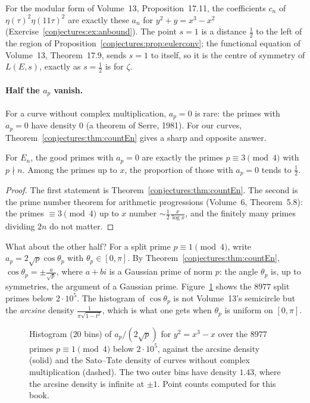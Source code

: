 For the modular form of Volume~13, Proposition~17.11, the coefficients $c_n$ of $\eta(\tau)^2\eta(11\tau)^2$ are exactly these $a_n$ for $y^2+y=x^3-x^2$
(Exercise~\ref{conjectures:ex:anbound}). The point $s=1$ is a distance $\frac12$ to the left of the region of Proposition~\ref{conjectures:prop:eulerconv}; the functional equation
of Volume~13, Theorem~17.9, sends $s=1$ to itself, so it is the centre of symmetry of $L(E,s)$, exactly as $s=\frac12$ is for $\zeta$.

\paragraph{Half the $a_p$ vanish.} For a curve without complex multiplication, $a_p=0$ is rare: the primes with $a_p=0$ have density $0$ (a theorem of Serre,
1981). For our curves, Theorem~\ref{conjectures:thm:countEn} gives a sharp and opposite answer.

\begin{corollary}\label{conjectures:cor:cmhalf}
For $E_n$, the good primes with $a_p=0$ are exactly the primes $p\equiv3\pmod4$ with $p\nmid n$. Among the primes up to $x$, the proportion of those with
$a_p=0$ tends to $\frac12$.
\end{corollary}
\begin{proof}
The first statement is Theorem~\ref{conjectures:thm:countEn}. The second is the prime number theorem for arithmetic progressions (Volume~6, Theorem~5.8): the primes
$\equiv3\pmod4$ up to $x$ number $\sim\frac12\frac x{\log x}$, and the finitely many primes dividing $2n$ do not matter.
\end{proof}

What about the other half? For a split prime $p\equiv1\pmod4$, write $a_p=2\sqrt p\cos\theta_p$ with $\theta_p\in[0,\pi]$. By Theorem~\ref{conjectures:thm:countEn},
$\cos\theta_p=\pm\frac a{\sqrt p}$, where $a+bi$ is a Gaussian prime of norm $p$: the angle $\theta_p$ is, up to symmetries, the argument of a Gaussian prime.
Figure~\ref{conjectures:fig:cm} shows the $8977$ split primes below $2\cdot10^5$. The histogram of $\cos\theta_p$ is not Volume~13's semicircle but the \emph{arcsine}
density $\frac1{\pi\sqrt{1-t^2}}$, which is what one gets when $\theta_p$ is uniform on $[0,\pi]$.

\begin{figure}[ht]
\centering
{}
\caption{Histogram ($20$ bins) of $a_p/(2\sqrt p)$ for $y^2=x^3-x$ over the $8977$ primes $p\equiv1\pmod4$ below $2\cdot10^5$, against the arcsine density
(solid) and the Sato--Tate density of curves without complex multiplication (dashed). The two outer bins have density $1.43$, where the arcsine density
is infinite at $\pm1$. Point counts computed for this book.}
\label{conjectures:fig:cm}
\end{figure}


